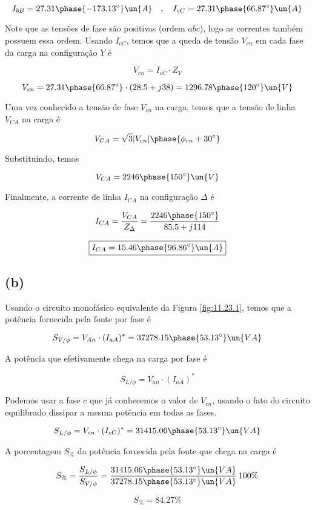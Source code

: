 \[ I_{bB} = 27.31\phase{-173.13^{\circ}} \un{A} \quad , \quad I_{cC} = 27.31\phase{66.87^{\circ}} \un{A} \]

Note que as tensões de fase são positivas (ordem $abc$), logo as correntes também possuem essa ordem.
Usando $I_{cC}$, temos que a queda de tensão $V_{cn}$ em cada fase da carga na configuração $Y$ é  

\[ V_{cn} = I_{cC} \cdot Z_Y \]

\[ V_{cn} = 27.31\phase{66.87^{\circ}} \cdot (28.5 +j38 ) = 1296.78\phase{120^{\circ}} \un{V} \]

Uma vez conhecido a tensão de fase $V_{cn}$ na carga, temos que a tensão de linha $V_{CA}$ na carga é

\begin{equation}\label{eq:11.23.2}
    V_{CA} = \sqrt{3}|V_{cn}|\phase{\phi_{cn} + 30^{\circ}}
\end{equation}

Substituindo, temos    

\[ V_{CA} = 2246\phase{150^{\circ}} \un{V} \]

Finalmente, a corrente de linha $I_{CA}$ na configuração $\Delta$ é  

\[ I_{CA} = \frac{V_{CA}}{Z_{\Delta}} = \frac{2246\phase{150^{\circ}}}{85.5 + j114} \]

\[ \boxed{I_{CA} = 15.46\phase{96.86^{\circ}} \un{A}} \]

\subsection*{(b)}

Usando o circuito monofásico equivalente da Figura \ref*{fig:11.23.1}, temos que a potência fornecida pela fonte por fase é  

\[ S_{V/\phi} = V_{An} \cdot (I_{aA})^* = 37278.15\phase{53.13^{\circ}} \un{VA} \]

A potência que efetivamente chega na carga por fase é 

\[ S_{L/\phi} = V_{an} \cdot (I_{aA})^* \]

Podemos usar a fase $c$ que já conhecemos o valor de $V_{cn}$, usando o fato do circuito equilibrado dissipar a mesma
potência em todas as fases.

\[ S_{L/\phi} = V_{cn} \cdot (I_{cC})^* = 31415.06\phase{53.13^{\circ}} \un{VA} \]

A porcentagem $S_{\%}$ da potência fornecida pela fonte que chega na carga é  

\[ S_{\%} = \frac{S_{L/\phi}}{S_{V/\phi}} = \frac{31415.06\phase{53.13^{\circ}} \un{VA}}{37278.15\phase{53.13^{\circ}} \un{VA}} \, 100\% \]

\[ \boxed{S_{\%} = 84.27\%} \]

